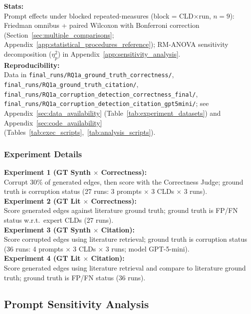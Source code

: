 \textbf{Stats:}\\
Prompt effects under blocked repeated-measures (block = CLD$\times$run, $n{=}9$): Friedman omnibus + paired Wilcoxon with Bonferroni correction (Section~\ref{sec:multiple_comparisons}; Appendix~\ref{app:statistical_procedures_reference}); RM-ANOVA sensitivity decomposition ($\eta^2_p$) in Appendix~\ref{app:sensitivity_analysis}.\\
\textbf{Reproducibility:}\\
Data in \texttt{final\_runs/RQ1a\_ground\_truth\_correctness/}, \texttt{final\_runs/RQ1a\_ground\_truth\_citation/}, \texttt{final\_runs/RQ1a\_corruption\_detection\_correctness\_final/}, \texttt{final\_runs/RQ1a\_corruption\_detection\_citation\_gpt5mini/}; see Appendix~\ref{sec:data_availability} (Table~\ref{tab:experiment_datasets}) and Appendix~\ref{sec:code_availability} (Tables~\ref{tab:exec_scripts},~\ref{tab:analysis_scripts}).

\subsubsection{Experiment Details}

\noindent\textbf{Experiment 1 (GT Synth $\times$ Correctness):}\\
Corrupt 30\% of generated edges, then score with the Correctness Judge; ground truth is corruption status (27 runs: 3 prompts $\times$ 3 CLDs $\times$ 3 runs).\\
\textbf{Experiment 2 (GT Lit $\times$ Correctness):}\\
Score generated edges against literature ground truth; ground truth is FP/FN status w.r.t.\ expert CLDs (27 runs).\\
\textbf{Experiment 3 (GT Synth $\times$ Citation):}\\
Score corrupted edges using literature retrieval; ground truth is corruption status (36 runs: 4 prompts $\times$ 3 CLDs $\times$ 3 runs; model GPT-5-mini).\\
\textbf{Experiment 4 (GT Lit $\times$ Citation):}\\
Score generated edges using literature retrieval and compare to literature ground truth; ground truth is FP/FN status (36 runs).

\subsection{Prompt Sensitivity Analysis}
\label{sec:rq1a_sensitivity}

